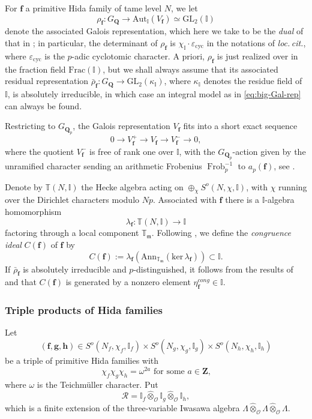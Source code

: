 \documentclass[10pt,letterpaper]{amsart}
\theoremstyle{plain}
\theoremstyle{definition}
\theoremstyle{definition}
\theoremstyle{plain}
\theoremstyle{plain}
\theoremstyle{plain}
\theoremstyle{remark}
\numberwithin{equation}{section}
\newcommand{\fkm}{\mathfrak{m}}
\DeclareMathOperator{\Frob}{\mathrm{Frob}}
\def\cO{\mathcal O}
\newcommand{\Q}{\mathbf{Q}}
\newcommand{\Z}{\mathbf{Z}}
\newcommand{\bT}{\mathbb{T}}
\newcommand{\cR}{\mathbb{I}}
\newcommand{\bfff}{{\boldsymbol{f}}}
\newcommand{\bff}{{\boldsymbol{f}}}
\newcommand{\bfg}{{\boldsymbol{g}}}
\newcommand{\bfh}{{\boldsymbol{h}}}
\begin{document}
For $\bfff$ a primitive Hida family of tame level $N$, we let 
\begin{equation}\label{eq:big-Gal-rep}
\rho_{\bfff}:G_\Q\rightarrow{\mathrm{Aut}}_{\cR}(V_\bfff)\simeq{\mathrm{GL}}_2(\cR)
\end{equation}
denote the associated Galois representation, which here we take to be the \emph{dual} of that in \cite[\S{3.2}]{hsieh-triple}; in particular, the determinant of $\rho_\bfff$ is $\chi_\cR\cdot\varepsilon_{\mathrm{cyc}}$ in the notations of \emph{loc.\,cit.}, where $\varepsilon_{\mathrm{cyc}}$ is the $p$-adic cyclotomic character. A priori, $\rho_{\bff}$ is just realized over in the fraction field ${\mathrm{Frac}}(\cR)$, but we shall always assume that its associated residual representation $\bar{\rho}_{\bff}:G_\Q\rightarrow{\mathrm{GL}}_2(\kappa_{\cR})$, where $\kappa_{\cR}$ denotes the residue field of $\cR$, is absolutely irreducible, in which case an integral model as in \eqref{eq:big-Gal-rep} can always be found.

Restricting to $G_{\Q_p}$, the Galois representation $V_\bfff$ fits into a short exact sequence
\[
0\rightarrow V_\bfff^+\rightarrow V_\bfff\rightarrow V_\bfff^-\rightarrow 0,
\]
where the quotient $V_\bfff^-$ is free of rank one over $\cR$, with the $G_{\Q_p}$-action given by the unramified character sending an arithmetic Frobenius $\Frob_p^{-1}$ to $a_p(\bfff)$, see \cite[Thm.~2.2.2]{wiles88}. 

Denote by $\bT(N,\cR)$ the Hecke algebra acting on $\oplus_\chi S^o(N,\chi,\cR)$, with $\chi$ running over the Dirichlet characters modulo $Np$. Associated with $\bfff$ there is a $\cR$-algebra homomorphism 
\[
\lambda_{\bfff}:\bT(N,\cR)\rightarrow\cR
\] 
factoring through a local component $\bT_{\fkm}$. Following \cite{hida-AJM}, we define the \emph{congruence ideal} $C(\bfff)$ of $\bfff$ by
\[
C(\bfff):=\lambda_{\bfff}({\mathrm{Ann}}_{\bT_\fkm}({\mathrm{ker}}\,\lambda_\bfff))\subset\cR.
\] 
If $\bar{\rho}_{\bfff}$ is absolutely irreducible and $p$-distinguished, it follows from the results of \cite{Wiles} and \cite{hida-AJM} that $C(\bfff)$ is generated by a nonzero element $\eta_{\bfff}^{cong}\in\cR$.

\subsubsection{Triple products of Hida families}\label{subsubsec:triple-hida}

Let
\[
(\bff,\bfg,\bfh)\in S^o(N_f,\chi_f,\cR_f)\times S^o(N_g,\chi_g,\cR_g)\times S^o(N_h,\chi_h,\cR_h)
\]
be a triple of primitive Hida families with 
\begin{equation}\label{eq:a}
\textrm{$\chi_f\chi_g\chi_h=\omega^{2a}$ for some $a\in\Z$,}\tag{sd-triple}
\end{equation} 
where $\omega$ is the Teichm\"uller character. Put 
\[
\mathcal{R}=\cR_f\hat\otimes_{\cO}\cR_g\hat\otimes_{\cO}\cR_h,
\] 
which is a finite extension of the three-variable Iwasawa algebra $\Lambda\hat\otimes_{\cO}\Lambda\hat\otimes_{\cO}\Lambda$. 
\end{document}
